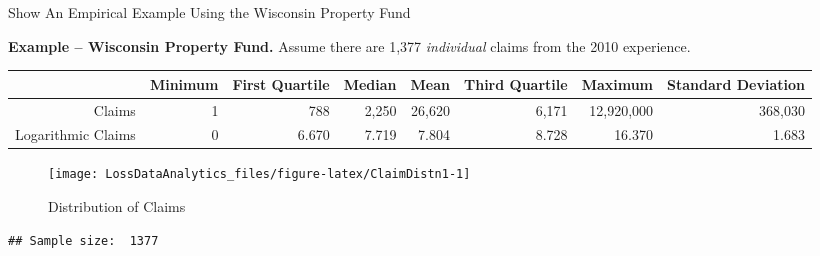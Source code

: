 \documentclass[]{book}
\newenvironment{Shaded}{\begin{snugshade}}{\end{snugshade}}
\newcommand{\KeywordTok}[1]{\textcolor[rgb]{0.13,0.29,0.53}{\textbf{#1}}}
\newcommand{\DataTypeTok}[1]{\textcolor[rgb]{0.13,0.29,0.53}{#1}}
\newcommand{\DecValTok}[1]{\textcolor[rgb]{0.00,0.00,0.81}{#1}}
\newcommand{\CharTok}[1]{\textcolor[rgb]{0.31,0.60,0.02}{#1}}
\newcommand{\StringTok}[1]{\textcolor[rgb]{0.31,0.60,0.02}{#1}}
\newcommand{\OtherTok}[1]{\textcolor[rgb]{0.56,0.35,0.01}{#1}}
\newcommand{\OperatorTok}[1]{\textcolor[rgb]{0.81,0.36,0.00}{\textbf{#1}}}
\newcommand{\NormalTok}[1]{#1}
\theoremstyle{definition}
\theoremstyle{definition}
\theoremstyle{definition}
\theoremstyle{remark}
\begin{document}
Show An Empirical Example Using the Wisconsin Property Fund

\hypertarget{EXM:S1:SI}{}
\textbf{Example -- Wisconsin Property Fund.} Assume there are 1,377
\emph{individual} claims from the 2010 experience.

\begin{longtable}[]{@{}rrrrrrrr@{}}
\toprule
& Minimum & First Quartile & Median & Mean & Third Quartile & Maximum &
Standard Deviation\tabularnewline
\midrule
\endhead
Claims & 1 & 788 & 2,250 & 26,620 & 6,171 & 12,920,000 &
368,030\tabularnewline
Logarithmic Claims & 0 & 6.670 & 7.719 & 7.804 & 8.728 & 16.370 &
1.683\tabularnewline
\bottomrule
\end{longtable}

\begin{Shaded}
\end{Shaded}

\begin{figure}

{\centering \texttt{[image: LossDataAnalytics\_files/figure-latex/ClaimDistn1-1]} 

}

\caption{Distribution of Claims}\label{fig:ClaimDistn1}
\end{figure}

\begin{verbatim}
## Sample size:  1377
\end{verbatim}
\end{document}
